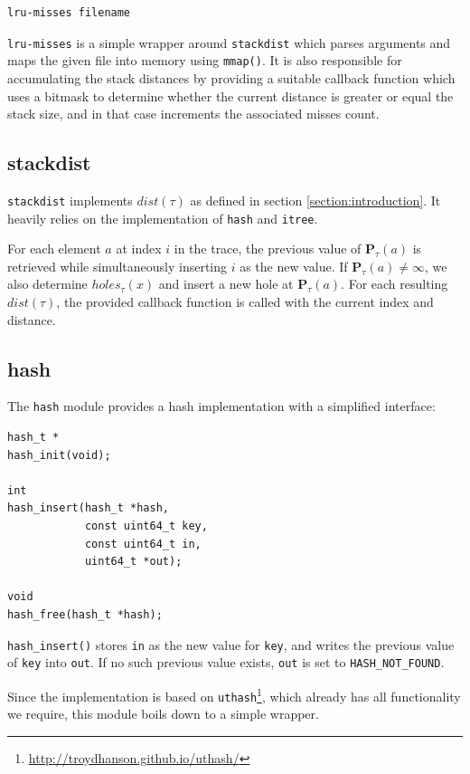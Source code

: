 \documentclass[a4paper,10pt]{article}
\begin{document}
\begin{verbatim}
lru-misses filename
\end{verbatim}

\verb|lru-misses| is a simple wrapper around \verb|stackdist| which parses arguments
and maps the given file into memory using \lstinline|mmap()|. It is also
responsible for accumulating the stack distances by providing a suitable callback
function which uses a bitmask to determine whether the current distance is greater or
equal the stack size, and in that case increments the associated misses count.

\subsection{stackdist}

\verb|stackdist| implements $dist(\tau)$ as defined in section \ref{section:introduction}.
It heavily relies on the implementation of \verb|hash| and \verb|itree|.

For each element $a$ at index $i$ in the trace, the previous value of $\mathbf{P}_\tau(a)$ is retrieved
while simultaneously inserting $i$ as the new value. If $\mathbf{P}_\tau(a) \neq \infty$,
we also determine $holes_\tau(x)$ and insert a new hole at $\mathbf{P}_\tau(a)$. For each
resulting $dist(\tau)$, the provided callback function is called with the current index
and distance.

\subsection{hash}

The \verb|hash| module provides a hash implementation with a simplified interface:

\begin{lstlisting}
hash_t *
hash_init(void);

int
hash_insert(hash_t *hash,
            const uint64_t key,
            const uint64_t in,
            uint64_t *out);

void
hash_free(hash_t *hash);
\end{lstlisting}

\lstinline|hash_insert()| stores \lstinline|in| as the new value for \lstinline|key|,
and writes the previous value of \lstinline|key| into \lstinline|out|. If no such previous
value exists, \lstinline|out| is set to \lstinline|HASH_NOT_FOUND|.

Since the implementation is based on \verb|uthash|\footnote{\url{http://troydhanson.github.io/uthash/}},
which already has all functionality we require, this module boils down to a simple wrapper.
\end{document}
